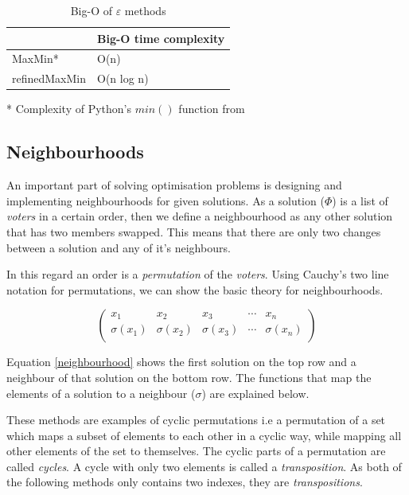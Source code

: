 \documentclass[12pt]{report}
\begin{document}
\begin{table}[H]
\centering
\caption{Big-O of $\varepsilon$ methods}
\label{maxMinComp}
\begin{tabular}{|l|l|}
\hline
              & Big-O time complexity \\ \hline
MaxMin*  & O(n) \\ \hline
refinedMaxMin & O(n log n)               \\ \hline
\end{tabular}
\end{table}
* Complexity of Python's $min()$ function from\cite{PythonComplexities}

\subsection{Neighbourhoods}\label{Neighbours}
An important part of solving optimisation problems is designing and implementing neighbourhoods for given solutions. As a solution ($\Phi$) is a list of \textit{voters} in a certain order, then we define a neighbourhood as any other solution that has two members swapped. This means that there are only two changes between a solution and any of it's neighbours.

In this regard an order is a \textit{permutation} of the \textit{voters}. Using Cauchy's two line notation for permutations\cite{Cauchy}, we can show the basic theory for neighbourhoods.

\begin{equation}\label{neighbourhood}
\begin{pmatrix}
x_{1} & x_{2} & x_{3} & \cdots & x_{n} \\
\sigma(x_{1}) & \sigma(x_{2}) & \sigma(x_{3}) & \cdots & \sigma(x_{n}) \\
\end{pmatrix}
\end{equation}

Equation \ref{neighbourhood} shows the first solution on the top row and a neighbour of that solution on the bottom row. The functions that map the elements of a solution to a neighbour ($\sigma$) are explained below.

These methods are examples of cyclic permutations i.e a permutation of a set which maps a subset of elements to each other in a cyclic way, while mapping all other elements of the set to themselves. The cyclic parts of a permutation are called \textit{cycles}. A cycle with only two elements is called a \textit{transposition}\cite{cyclicPerm}. As both of the following methods only contains two indexes, they are \textit{transpositions}.
\end{document}
